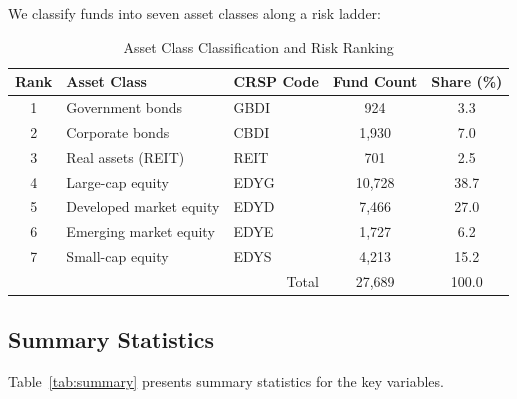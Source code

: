\documentclass[11pt,a4paper]{article}
\begin{document}
We classify funds into seven asset classes along a risk ladder:

\begin{table}[H]
\centering
\caption{Asset Class Classification and Risk Ranking}
\label{tab:asset_classes}
\begin{tabular}{cllcc}
\toprule
Rank & Asset Class & CRSP Code & Fund Count & Share (\%) \\
\midrule
1 & Government bonds & GBDI & 924 & 3.3 \\
2 & Corporate bonds & CBDI & 1,930 & 7.0 \\
3 & Real assets (REIT) & REIT & 701 & 2.5 \\
4 & Large-cap equity & EDYG & 10,728 & 38.7 \\
5 & Developed market equity & EDYD & 7,466 & 27.0 \\
6 & Emerging market equity & EDYE & 1,727 & 6.2 \\
7 & Small-cap equity & EDYS & 4,213 & 15.2 \\
\midrule
\multicolumn{3}{r}{Total} & 27,689 & 100.0 \\
\bottomrule
\end{tabular}
\end{table}

\subsection{Summary Statistics}

Table~\ref{tab:summary} presents summary statistics for the key variables.
\end{document}
